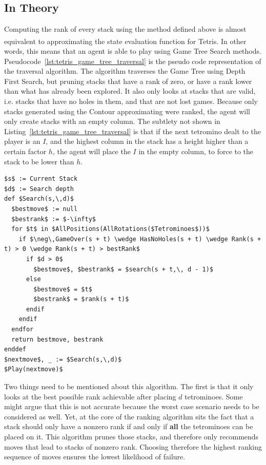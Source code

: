 \documentclass[fontsize=12pt]{article}
\def\tetris{Tetris\textsuperscript{\textregistered}}
\begin{document}
\subsection{In Theory}
\label{sub:in_theory}
\par Computing the rank of every stack using the method defined above is almost equivalent to approximating the state evaluation function for \tetris{}. In other words, this means that an agent is able to play using Game Tree Search methods. Pseudocode~\ref{lst:tetris_game_tree_traversal} is the pseudo code representation of the traversal algorithm. The algorithm traverses the Game Tree using Depth First Search, but pruning stacks that have a rank of zero, or have a rank lower than what has already been explored. It also only looks at stacks that are valid, i.e. stacks that have no holes in them, and that are not lost games. Because only stacks generated using the Contour approximating were ranked, the agent will only create stacks with an empty column. The subtlety not shown in Listing~\ref{lst:tetris_game_tree_traversal} is that if the next tetromino dealt to the player is an $I$, and the highest column in the stack has a height higher than a certain factor $h$, the agent will place the $I$ in the empty column, to force to the stack to be lower than $h$.
\renewcommand{\lstlistingname}{Pseudocode}
\begin{lstlisting}[caption=\relax \tetris{} Game Tree Traversal,label={lst:tetris_game_tree_traversal}, style=Pseudocode]
$s$ := Current Stack
$d$ := Search depth
def $Search(s,\,d)$
  $bestmove$ := null
  $bestrank$ := $-\infty$
  for $t$ in $AllPositions(AllRotations($Tetrominoes$))$
    if $\neg\,GameOver(s + t) \wedge HasNoHoles(s + t) \wedge Rank(s + t) > 0 \wedge Rank(s + t) > bestRank$
      if $d > 0$
        $bestmove$, $bestrank$ = $search(s + t,\, d - 1)$
      else
        $bestmove$ = $t$
        $bestrank$ = $rank(s + t)$
      endif
    endif
  endfor
  return bestmove, bestrank
enddef
$nextmove$, _ := $Search(s,\,d)$
$Play(nextmove)$
\end{lstlisting}
\par Two things need to be mentioned about this algorithm. The first is that it only looks at the best possible rank achievable after placing $d$ tetrominoes. Some might argue that this is not accurate because the worst case scenario needs to be considered as well. Yet, at the core of the ranking algorithm sits the fact that a stack should only have a nonzero rank if and only if \textbf{all} the tetrominoes can be placed on it. This algorithm prunes those stacks, and therefore only recommends moves that lead to stacks of nonzero rank. Choosing therefore the highest ranking sequence of moves ensures the lowest likelihood of failure.
\end{document}
